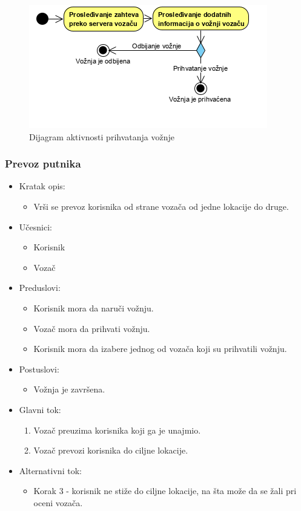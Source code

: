 \begin{figure}[H]
\begin{center}
\includegraphics[scale=1.3]{Slike/PrihvatanjeVoznje.png}
\end{center}
    \caption{Dijagram aktivnosti prihvatanja vožnje}
\label{fig:PrihvatanjeVožnje}
\end{figure}

\subsubsection{\bfseries Prevoz putnika}

\begin{itemize}
	\item Kratak opis:
		\begin{itemize}
			\item Vrši se prevoz korisnika od strane vozača od jedne lokacije do druge.
		\end{itemize}
	\item Učesnici:
		\begin{itemize}
		    \item Korisnik
		    \item Vozač
		\end{itemize}				
	\item Preduslovi:
		\begin{itemize}
		    \item Korisnik mora da naruči vožnju.
		    \item Vozač mora da prihvati vožnju.
		    \item Korisnik mora da izabere jednog od vozača koji su prihvatili vožnju.
		\end{itemize}
	\item Postuslovi:
		\begin{itemize}
			\item Vožnja je završena.
		\end{itemize}	
	\item Glavni tok:
		\begin{enumerate}
		    \item Vozač preuzima korisnika koji ga je unajmio.  
		    \item Vozač prevozi korisnika do ciljne lokacije.
		\end{enumerate}
	\item Alternativni tok:
	    \begin{itemize}
	        \item Korak 3 - korisnik ne stiže do ciljne lokacije, na šta može da se žali pri oceni vozača.
	    \end{itemize}
\end{itemize}


